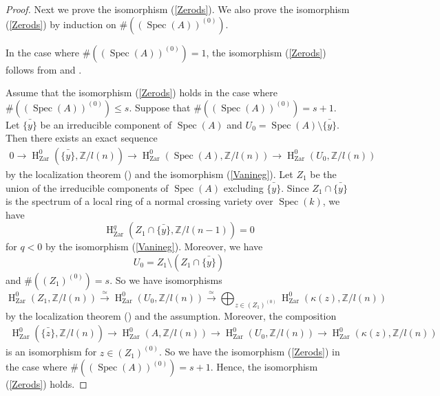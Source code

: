 \documentclass{article}
\newcommand{\spec}{\operatorname{Spec}}
\newcommand{\Zar}{\mathrm{Zar}}
\newcommand{\HO}{\operatorname{H}}
\begin{document}
\begin{proof}
Next we prove the isomorphism (\ref{Zerods}). We also prove the isomorphism (\ref{Zerods})
by induction on 
$\#\left((\spec(A))^{(0)}\right)$.

In the case where 
$\#\left((\spec(A))^{(0)}\right)=1$,
the isomorphism (\ref{Zerods}) follows from \cite[p.774, Theorem 1.2.4]{Ge}
and \cite{V2}.

Assume that the isomorphism (\ref{Zerods}) holds in the case where
$\#\left((\spec(A))^{(0)}\right)\leq s$. Suppose that
$\#\left((\spec(A))^{(0)}\right)=s+1$. Let $\bar{\{y\}}$ be an irreducible component of
$\spec(A)$ and $U_{0}=\spec(A)\setminus\bar{\{y\}}$. Then there exists an exact sequence
%
\begin{align*}
0\to   
\HO^{0}_{\Zar}(
\bar{\{y\}},
\mathbb{Z}/l(n)
)
\to
\HO^{0}_{\Zar}(
\spec(A),
\mathbb{Z}/l(n)
)
\to
\HO^{0}_{\Zar}(
U_{0},
\mathbb{Z}/l(n)
)
\end{align*}
%
by the localization theorem (\cite[p.779, Theorem 3.2]{Ge})
and the isomorphism (\ref{Vanineg}). 
Let $Z_{1}$ be the union of the irreducible components
of $\spec(A)$ excluding $\bar{\{y\}}$. Since $Z_{1}\cap\bar{\{y\}}$ is the spectrum of a 
local ring of a normal crossing variety over $\spec(k)$, we have
%
\begin{equation*}
\HO^{q}_{\Zar}(
Z_{1}\cap\bar{\{y\}},
\mathbb{Z}/l(n-1)
)
=
0
\end{equation*}
%
for $q<0$ by the isomorphism (\ref{Vanineg}). Moreover, we have
%
\begin{equation*}
U_{0}
=
Z_{1}\setminus
\left(Z_{1}\cap\bar{\{y\}}\right)
\end{equation*}
%
and $\#((Z_{1})^{(0)})=s$.
So we have isomorphisms
%
\begin{equation*}
\HO^{0}_{\Zar}(
Z_{1}, \mathbb{Z}/l(n)
)    
\xrightarrow{\simeq}
\HO^{0}_{\Zar}(
U_{0},
\mathbb{Z}/l(n)
)
\xrightarrow{\simeq}
\bigoplus_{z\in (Z_{1})^{(0)}}
\HO^{0}_{\Zar}(
\kappa(z),
\mathbb{Z}/l(n)
)
\end{equation*}
%
by the localization theorem (\cite[p.779, Theorem 3.2]{Ge}) and the assumption. 
Moreover,
the composition
%
\begin{align*}
\HO^{0}_{\Zar}(
\bar{\{z\}},
\mathbb{Z}/l(n)
)    
\to
\HO^{0}_{\Zar}(
A,
\mathbb{Z}/l(n)
)
\to
\HO^{0}_{\Zar}(
U_{0},
\mathbb{Z}/l(n)
)
\to
\HO^{0}_{\Zar}(
\kappa(z),
\mathbb{Z}/l(n)
)
\end{align*}
%
is an isomorphism for $z\in (Z_{1})^{(0)}$.
So we have the isomorphism (\ref{Zerods}) in the case where
$\#((\spec(A))^{(0)})=s+1$. Hence, the isomorphism (\ref{Zerods}) holds.


\end{proof}
\end{document}
